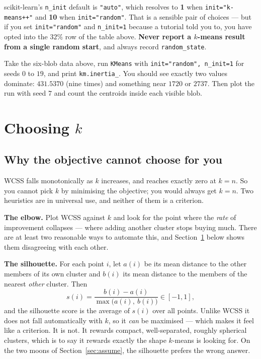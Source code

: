 \documentclass[11pt]{article}
\begin{document}
\begin{caution}
scikit-learn's \texttt{n\_init} default is \texttt{"auto"}, which resolves to
\textbf{1} when \texttt{init="k-means++"} and \textbf{10} when
\texttt{init="random"}. That is a sensible pair of choices --- but if you set
\texttt{init="random"} and \texttt{n\_init=1} because a tutorial told you to,
you have opted into the $32\%$ row of the table above. \textbf{Never report a
$k$-means result from a single random start}, and always record
\texttt{random\_state}.
\end{caution}

\begin{tryit}
Take the six-blob data above, run \texttt{KMeans} with
\texttt{init="random", n\_init=1} for seeds $0$ to $19$, and print
\texttt{km.inertia\_}. You should see exactly two values dominate: $431.5370$
(nine times) and something near $1720$ or $2737$. Then plot the run with seed
$7$ and count the centroids inside each visible blob.
\end{tryit}

\section{Choosing $k$}
\label{sec:k}

\subsection{Why the objective cannot choose for you}

WCSS falls monotonically as $k$ increases, and reaches exactly zero at
$k = n$. So you cannot pick $k$ by minimising the objective; you would always
get $k = n$. Two heuristics are in universal use, and neither of them is a
criterion.

\textbf{The elbow.} Plot WCSS against $k$ and look for the point where the
\emph{rate} of improvement collapses --- where adding another cluster stops
buying much. There are at least two reasonable ways to automate this, and
Section~\ref{sec:k} below shows them disagreeing with each other.

\textbf{The silhouette.} For each point $i$, let $a(i)$ be its mean distance
to the other members of its own cluster and $b(i)$ its mean distance to the
members of the nearest \emph{other} cluster. Then
\begin{equation}
  s(i) = \frac{b(i) - a(i)}{\max\bigl(a(i),\ b(i)\bigr)} \in [-1, 1],
  \label{eq:sil}
\end{equation}
and the silhouette score is the average of $s(i)$ over all points. Unlike
WCSS it does not fall automatically with $k$, so it \emph{can} be maximised
--- which makes it feel like a criterion. It is not. It rewards compact,
well-separated, roughly spherical clusters, which is to say it rewards
exactly the shape $k$-means is looking for. On the two moons of
Section~\ref{sec:assume}, the silhouette prefers the wrong answer.
\end{document}

